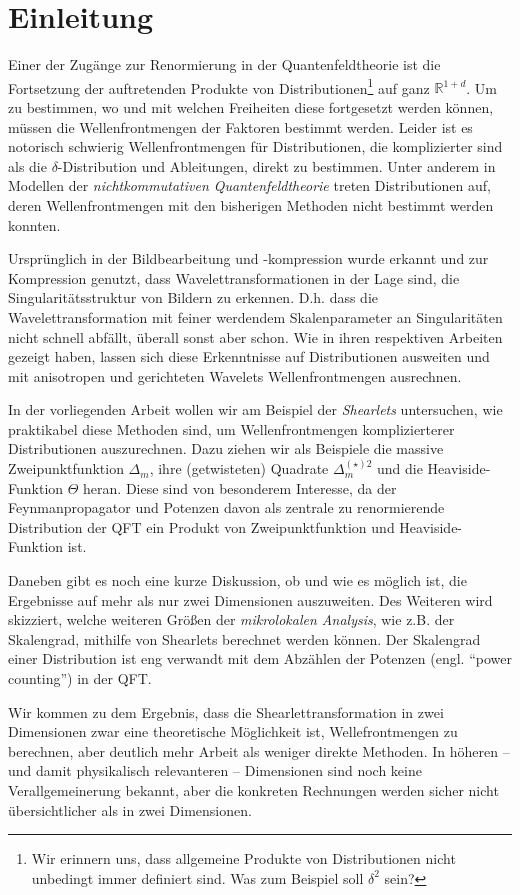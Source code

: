 
\chapter{Einleitung} %
\label{sec:einleitung_physics}
Einer der Zugänge zur Renormierung in der Quantenfeldtheorie ist die Fortsetzung der auftretenden Produkte von Distributionen\footnote{Wir erinnern uns, dass allgemeine Produkte von Distributionen nicht unbedingt immer definiert sind. Was zum Beispiel soll \(\delta^2\) sein?} auf ganz $\mathbb{R}^{1+d}$. Um zu bestimmen, wo und mit welchen Freiheiten diese fortgesetzt werden können, müssen die Wellenfrontmengen der Faktoren bestimmt werden. Leider ist es notorisch schwierig Wellenfrontmengen für Distributionen, die komplizierter sind als die $\delta$-Distribution und Ableitungen, direkt zu bestimmen. Unter anderem in Modellen der \emph{nichtkommutativen Quantenfeldtheorie} \cite{kappaMinkowski,Doplicher1995,StringLocalized} treten Distributionen auf, deren Wellenfrontmengen mit den bisherigen Methoden nicht bestimmt werden konnten.

Ursprünglich in der Bildbearbeitung und -kompression wurde erkannt und zur Kompression genutzt, dass Wavelettransformationen in der Lage sind, die Singularitätsstruktur von Bildern zu erkennen. D.h. dass die Wavelettransformation mit feiner werdendem Skalenparameter an Singularitäten nicht schnell abfällt, überall sonst aber schon.
Wie \textcite{Kutyniok2008,Candes2005,Contourlets} in ihren respektiven Arbeiten gezeigt haben, lassen sich diese Erkenntnisse auf Distributionen ausweiten und mit anisotropen und gerichteten Wavelets Wellenfrontmengen ausrechnen.

In der vorliegenden Arbeit wollen wir am Beispiel der \emph{Shearlets} untersuchen, wie praktikabel diese Methoden sind, um Wellenfrontmengen komplizierterer Distributionen auszurechnen. Dazu ziehen wir als Beispiele die massive Zweipunktfunktion \(\Delta_m\), ihre (getwisteten) Quadrate \(\Delta_m^{(\star) 2}\) und die Heaviside-Funktion \(\Theta\) heran. Diese sind von besonderem Interesse, da der Feynmanpropagator und Potenzen davon als zentrale zu renormierende Distribution der QFT ein Produkt von Zweipunktfunktion und Heaviside-Funktion ist.

Daneben gibt es noch eine kurze Diskussion, ob und wie es möglich ist, die Ergebnisse auf mehr als nur zwei Dimensionen auszuweiten.
Des Weiteren wird skizziert, welche weiteren Größen der \emph{mikrolokalen Analysis}, wie z.B. der Skalengrad, mithilfe von Shearlets berechnet werden können. Der Skalengrad einer Distribution ist eng verwandt mit dem Abzählen der Potenzen (engl. "`power counting"') in der QFT.

Wir kommen zu dem Ergebnis, dass die Shearlettransformation in zwei Dimensionen zwar eine theoretische Möglichkeit ist, Wellefrontmengen zu berechnen, aber deutlich mehr Arbeit als weniger direkte Methoden. In höheren -- und damit physikalisch relevanteren -- Dimensionen sind noch keine Verallgemeinerung bekannt, aber die konkreten Rechnungen werden sicher nicht übersichtlicher als in zwei Dimensionen.


